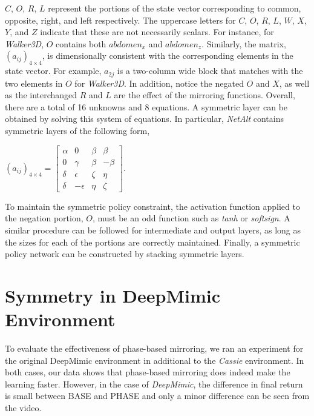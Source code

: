 $C$, $O$, $R$, $L$ represent the portions of the state vector corresponding to common, opposite, right, and left respectively.  The uppercase letters for $C$, $O$, $R$, $L$, $W$, $X$, $Y$, and $Z$ indicate that these are not necessarily scalars. For instance, for \textit{Walker3D}, $O$ contains both $abdomen_x$ and $abdomen_z$.  Similarly, the matrix, $(a_{ij})_{4\times4}$, is dimensionally consistent with the corresponding elements in the state vector.  For example, $a_{2j}$ is a two-column wide block that matches with the two elements in $O$ for \textit{Walker3D}.  In addition, notice the negated $O$ and $X$, as well as the interchanged $R$ and $L$ are the effect of the mirroring functions.  Overall, there are a total of 16 unknowns and 8 equations.  A symmetric layer can be obtained by solving this system of equations.  In particular, \textit{NetAlt} contains symmetric layers of the following form,

\begin{center}
$(a_{ij})_{4\times4} = \begin{bmatrix} 
\alpha &  0 & \beta & \beta \\ 
0 & \gamma & \beta & -\beta \\
\delta &  \epsilon & \zeta & \eta \\
\delta & -\epsilon & \eta & \zeta
\end{bmatrix}$.
\end{center}

To maintain the symmetric policy constraint, the activation function applied to the negation portion, $O$, must be an odd function such as \textit{tanh} or \textit{softsign}.  A similar procedure can be followed for intermediate and output layers, as long as the sizes for each of the portions are correctly maintained.  Finally, a symmetric policy network can be constructed by stacking symmetric layers.

\section{Symmetry in DeepMimic Environment}
\label{sec:deepmimic-results}

To evaluate the effectiveness of phase-based mirroring, we ran an experiment for the original DeepMimic environment \citep{2018-TOG-deepMimic} in additional to the \textit{Cassie} environment.  In both cases, our data shows that phase-based mirroring does indeed make the learning faster.  However, in the case of \textit{DeepMimic}, the difference in final return is small between BASE and PHASE and only a minor difference can be seen from the video.

